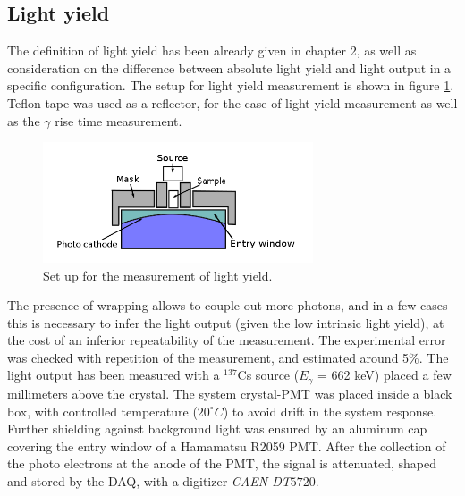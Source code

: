 \subsection{Light yield}
The definition of light yield has been already given in chapter 2, as well as consideration on the difference between absolute light yield and light output in a specific configuration. The setup for light yield measurement is shown in figure \ref{fig:set_LY}. 
Teflon tape was used as a reflector, for the case of light yield measurement as well as the $\gamma$ rise time measurement. 
\begin{figure}[htbp]
\begin{center}
\includegraphics[width=8cm]{../Pictures/Chapter_5/LY_3.png}
\end{center}
\caption[Light Yield setup]{Set up for the measurement of light yield.}
\label{fig:set_LY}
\end{figure}
The presence of wrapping allows to couple out more photons, and in a few cases this is necessary to infer the light output (given the low intrinsic light yield), at the cost of an inferior repeatability of the measurement. The experimental error was checked with repetition of the measurement, and estimated around 5$\%$.
The light output has been measured with a $^{137}$Cs source ($E_{\gamma}$ = 662 keV) placed a few millimeters above the crystal. The system crystal-PMT was placed inside a black box, with controlled temperature ($20^{\circ}C$) to avoid drift in the system response.
Further shielding against background light was ensured by an aluminum cap covering the entry window of a Hamamatsu R2059 PMT.
After the collection of the photo electrons at the anode of the PMT, the signal is attenuated, shaped and stored by the DAQ, with a digitizer \textit{CAEN DT$5720$}.

